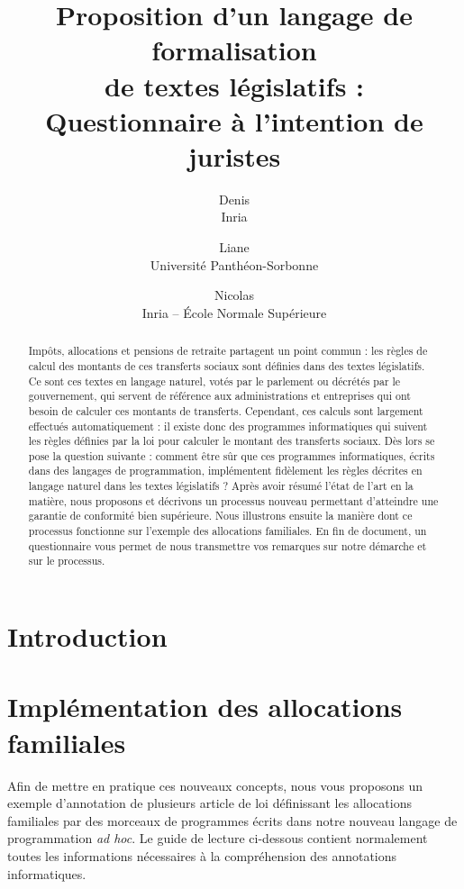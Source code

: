 \documentclass[11pt, french, a4paper]{article}
\title{
  Proposition d'un langage de formalisation\\
  de textes législatifs :\\
  Questionnaire à l'intention de juristes
}
\author{
  Denis \bsc{Merigoux}\\Inria\and
  Liane \bsc{Huttner}\\Université Panthéon-Sorbonne\and
  Nicolas \bsc{Chataing}\\Inria -- École Normale Supérieure\and
}
\begin{document}
\maketitle
\renewcommand{\contentsname}{Sommaire}

\begin{abstract}
Impôts, allocations et pensions de retraite partagent un point commun : les règles de calcul des montants de ces transferts sociaux sont définies dans des textes législatifs. Ce sont ces textes en langage naturel, votés par le parlement ou décrétés par le gouvernement, qui servent de référence aux administrations et entreprises qui ont besoin de calculer ces montants de transferts. Cependant, ces calculs sont largement effectués automatiquement : il existe donc des programmes informatiques qui suivent les règles définies par la loi pour calculer le montant des transferts sociaux. Dès lors se pose la question suivante : comment être sûr que ces programmes informatiques, écrits dans des langages de programmation, implémentent fidèlement les règles décrites en langage naturel dans les textes législatifs ? Après avoir résumé l'état de l'art en la matière, nous proposons et décrivons un processus nouveau permettant d'atteindre une garantie de conformité bien supérieure. Nous illustrons ensuite la manière dont ce processus fonctionne sur l'exemple des allocations familiales. En fin de document, un questionnaire vous permet de nous transmettre vos remarques sur notre démarche et sur le processus.
\end{abstract}

\tableofcontents

\section{Introduction}



\section{Implémentation des allocations familiales}

Afin de mettre en pratique ces nouveaux concepts, nous vous proposons un exemple d'annotation de plusieurs article de loi  définissant les allocations familiales par des morceaux de programmes écrits dans notre nouveau langage de programmation \emph{ad hoc}. Le guide de lecture ci-dessous contient normalement toutes les informations nécessaires à la compréhension des annotations informatiques.
\end{document}
